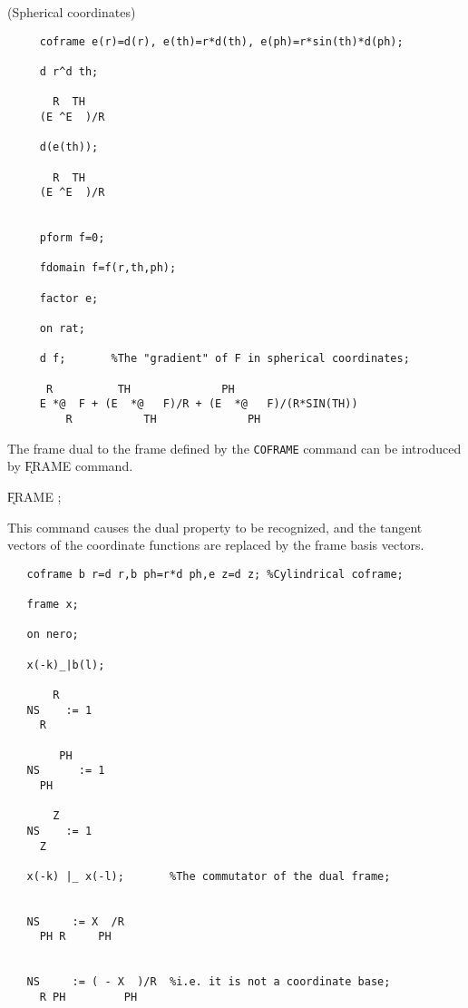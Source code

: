 \example (Spherical coordinates)

\begin{verbatim}
     coframe e(r)=d(r), e(th)=r*d(th), e(ph)=r*sin(th)*d(ph);

     d r^d th;

       R  TH
     (E ^E  )/R

     d(e(th));

       R  TH
     (E ^E  )/R


     pform f=0;

     fdomain f=f(r,th,ph);

     factor e;

     on rat;

     d f;       %The "gradient" of F in spherical coordinates;

      R          TH              PH
     E *@  F + (E  *@   F)/R + (E  *@   F)/(R*SIN(TH))
         R           TH              PH
\end{verbatim}

The frame dual to the frame defined by the {\tt COFRAME} command can
be introduced by \k{FRAME} command. 

\hspace*{2em} \k{FRAME} ;\label{FRAME}

This command causes the
dual property to be recognized, and the tangent vectors of the
coordinate functions are replaced by the frame basis vectors.

\example{}

\begin{verbatim}
   coframe b r=d r,b ph=r*d ph,e z=d z; %Cylindrical coframe;

   frame x;

   on nero;

   x(-k)_|b(l);

       R
   NS    := 1
     R

        PH
   NS      := 1
     PH

       Z
   NS    := 1
     Z

   x(-k) |_ x(-l);       %The commutator of the dual frame;


   NS     := X  /R
     PH R     PH


   NS     := ( - X  )/R  %i.e. it is not a coordinate base;
     R PH         PH

\end{verbatim}

